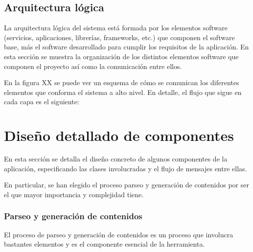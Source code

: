 \subsection{Arquitectura lógica}

La arquitectura lógica del sistema está formada por los elementos software
(servicios, aplicaciones, librerías, frameworks, etc.) que componen el software base,
más el software desarrollado para cumplir los requisitos de la aplicación. En esta
sección se muestra la organización de los distintos elementos software que 
componen el proyecto así como la comunicación entre ellos.

En la figura XX se puede ver un esquema de cómo se comunican los diferentes
elementos que conforma el sistema a alto nivel. En detalle, el flujo que sigue
en cada capa es el siguiente:


\section{Diseño detallado de componentes}

En esta sección se detalla el diseño concreto de algunos componentes de la aplicación, 
especificando las clases involucradas y el flujo de mensajes entre ellas.

En particular, se han elegido el proceso parseo y generación de contenidos
por ser el que mayor importancia y complejidad tiene.

\subsubsection{Parseo y generación de contenidos}

El proceso de parseo y generación de contenidos es un proceso que involucra bastantes
elementos y es el componente esencial de la herramienta.

